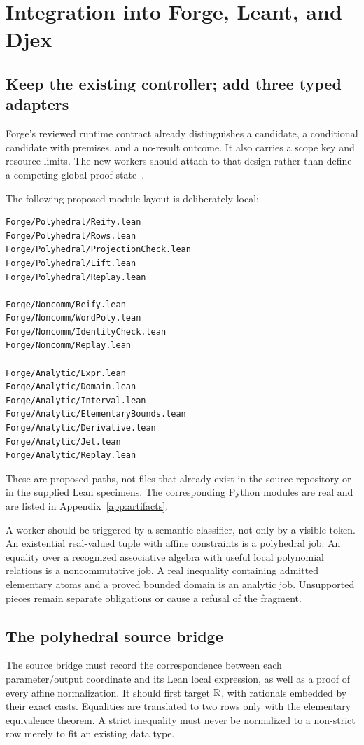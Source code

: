 \section{Integration into Forge, Leant, and Djex}
\label{sec:integration}

\subsection{Keep the existing controller; add three typed adapters}
Forge's reviewed runtime contract already distinguishes a candidate, a conditional candidate with premises, and a no-result outcome. It also carries a scope key and resource limits. The new workers should attach to that design rather than define a competing global proof state~\cite{forge-runtime}.

The following proposed module layout is deliberately local:
\par\noindent\begin{minipage}{\linewidth}
\begin{lstlisting}
Forge/Polyhedral/Reify.lean
Forge/Polyhedral/Rows.lean
Forge/Polyhedral/ProjectionCheck.lean
Forge/Polyhedral/Lift.lean
Forge/Polyhedral/Replay.lean

Forge/Noncomm/Reify.lean
Forge/Noncomm/WordPoly.lean
Forge/Noncomm/IdentityCheck.lean
Forge/Noncomm/Replay.lean

Forge/Analytic/Expr.lean
Forge/Analytic/Domain.lean
Forge/Analytic/Interval.lean
Forge/Analytic/ElementaryBounds.lean
Forge/Analytic/Derivative.lean
Forge/Analytic/Jet.lean
Forge/Analytic/Replay.lean
\end{lstlisting}
\end{minipage}\par
These are proposed paths, not files that already exist in the source repository or in the supplied Lean specimens. The corresponding Python modules are real and are listed in Appendix~\ref{app:artifacts}.

A worker should be triggered by a semantic classifier, not only by a visible token. An existential real-valued tuple with affine constraints is a polyhedral job. An equality over a recognized associative algebra with useful local polynomial relations is a noncommutative job. A real inequality containing admitted elementary atoms and a proved bounded domain is an analytic job. Unsupported pieces remain separate obligations or cause a refusal of the fragment.

\subsection{The polyhedral source bridge}
The source bridge must record the correspondence between each parameter/output coordinate and its Lean local expression, as well as a proof of every affine normalization. It should first target \(\mathbb{R}\), with rationals embedded by their exact casts. Equalities are translated to two rows only with the elementary equivalence theorem. A strict inequality must never be normalized to a non-strict row merely to fit an existing data type.

